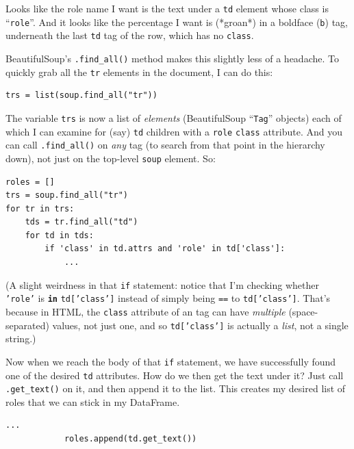 Looks like the role name I want is the text under a \texttt{td} element whose
class is ``\texttt{role}''. And it looks like the percentage I want is
(*groan*) in a boldface (\texttt{b}) tag, underneath the last \texttt{td} tag
of the row, which has no \texttt{class}.

BeautifulSoup's \texttt{.find\_all()} method makes this slightly less of a
headache. To quickly grab all the \texttt{tr} elements in the document, I can
do this:

\begin{Verbatim}[fontsize=\footnotesize,samepage=true,frame=single]
trs = list(soup.find_all("tr"))
\end{Verbatim}

The variable \texttt{trs} is now a list of \textit{elements} (BeautifulSoup
``\texttt{Tag}'' objects) each of which I can examine for (say) \texttt{td}
children with a \texttt{role} \texttt{class} attribute. And you can call
\texttt{.find\_all()} on \textit{any} tag (to search from that point in the
hierarchy down), not just on the top-level \texttt{soup} element. So:

\begin{Verbatim}[fontsize=\footnotesize,samepage=true,frame=single]
roles = []
trs = soup.find_all("tr")
for tr in trs:
    tds = tr.find_all("td")
    for td in tds:
        if 'class' in td.attrs and 'role' in td['class']:
            ...
\end{Verbatim}

(A slight weirdness in that \texttt{if} statement: notice that I'm checking
whether \texttt{'role'} is \textbf{\texttt{in}} \texttt{td['class']} instead
of simply being \texttt{==} to \texttt{td['class']}. That's because in HTML,
the \texttt{class} attribute of an tag can have \textit{multiple}
(space-separated) values, not just one, and so \texttt{td['class']} is
actually a \textit{list}, not a single string.)

Now when we reach the body of that \texttt{if} statement, we have successfully
found one of the desired \texttt{td} attributes. How do we then get the text
under it? Just call \texttt{.get\_text()} on it, and then append it to the
list. This creates my desired list of roles that we can stick in my DataFrame.

\begin{Verbatim}[fontsize=\footnotesize,samepage=true,frame=single]
            ...
            roles.append(td.get_text())
\end{Verbatim}

